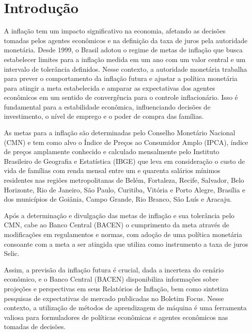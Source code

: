 
\chapter[Introdução]{Introdução}

A inflação tem um impacto significativo na economia, afetando as decisões tomadas pelos agentes econômicos e na definição da taxa de juros pela autoridade monetária. Desde 1999, o Brasil adotou o regime de metas de inflação que busca estabelecer limites para a inflação medida em um ano com um valor central e um intervalo de tolerância definidos. Nesse contexto, a autoridade monetária trabalha para prever o comportamento da inflação futura e ajustar a política monetária para atingir a meta estabelecida e amparar as expectativas dos agentes econômicos em um sentido de convergência para o controle inflacionário. Isso é fundamental para a estabilidade econômica, influenciando decisões de investimento, o nível de emprego e o poder de compra das famílias.

As metas para a inflação são determinadas pelo Conselho Monetário Nacional (CMN) e tem como alvo o Índice de Preços ao Consumidor Amplo (IPCA), índice de preços amplamente conhecido e calculado mensalmente pelo Instituto Brasileiro de Geografia e Estatística (IBGE) que leva em consideração o custo de vida de famílias com renda mensal entre um e quarenta salários mínimos residentes nas regiões metropolitanas de Belém, Fortaleza, Recife, Salvador, Belo Horizonte, Rio de Janeiro, São Paulo, Curitiba, Vitória e Porto Alegre, Brasília e dos municípios de Goiânia, Campo Grande, Rio Branco, São Luís e Aracaju. 

Após a determinação e divulgação das metas de inflação e sua tolerância pelo CMN, cabe ao Banco Central (BACEN) o cumprimento da meta através de modificações em regulamentos e normas, com adoção de uma política monetária consoante com a meta a ser atingida que utiliza como instrumento a taxa de juros Selic.

Assim, a previsão da inflação futura é crucial, dada a incerteza do cenário econômico, e o Banco Central (BACEN) disponibiliza informações sobre projeções e  perspectivas em seus Relatórios de Inflação, bem como sintetiza pesquisas de expectativas de mercado publicadas no Boletim Focus. Nesse contexto, a utilização de métodos de aprendizagem de máquina é uma ferramenta valiosa para formuladores de políticas econômicas e agentes econômicos nas tomadas de decisões.

